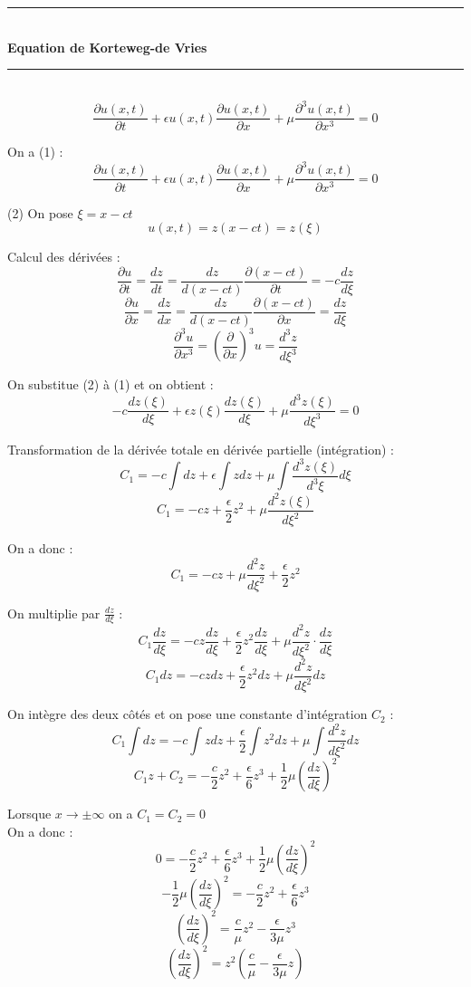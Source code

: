 \documentclass[12pt,a4paper]{article}
\begin{document}
\begin{center}
    \rule{\linewidth}{0.5pt} \\
    \Large \textbf{Equation de Korteweg-de Vries} \\
    \rule{\linewidth}{0.5pt} \\
    \vspace{0.5cm}
    \[ \frac{\partial u(x,t)}{\partial t}+\epsilon u(x,t)\frac{\partial u(x,t)}{\partial x}+\mu\frac{\partial^{3}u(x,t)}{\partial x^{3}}=0 \]
\end{center}


On a (1) :
\[ \frac{\partial u(x,t)}{\partial t}+\epsilon u(x,t)\frac{\partial u(x,t)}{\partial x}+\mu\frac{\partial^{3}u(x,t)}{\partial x^{3}}=0 \]

(2) On pose $\xi=x-ct$
\[ u(x,t)=z(x-ct)=z(\xi) \]

Calcul des dérivées :
\[ \frac{\partial u}{\partial t}=\frac{dz}{dt}=\frac{dz}{d(x-ct)}\frac{\partial(x-ct)}{\partial t}=-c\frac{dz}{d\xi} \]
\[ \frac{\partial u}{\partial x}=\frac{dz}{dx}=\frac{dz}{d(x-ct)}\frac{\partial(x-ct)}{\partial x}=\frac{dz}{d\xi} \]
\[ \frac{\partial^{3}u}{\partial x^{3}}=\left(\frac{\partial}{\partial x}\right)^{3}u=\frac{d^{3}z}{d\xi^{3}} \]

On substitue (2) à (1) et on obtient :
\[ -c\frac{dz(\xi)}{d\xi}+\epsilon z(\xi)\frac{dz(\xi)}{d\xi}+\mu\frac{d^{3}z(\xi)}{d\xi^{3}}=0 \]

Transformation de la dérivée totale en dérivée partielle (intégration) :
\[ C_{1}=-c\int dz+\epsilon\int z dz+\mu\int\frac{d^{3}z(\xi)}{d^{3}\xi} d\xi \]
\[ C_{1}=-cz+\frac{\epsilon}{2}z^{2}+\mu\frac{d^{2}z(\xi)}{d\xi^{2}} \]


On a donc :
\[ C_{1}=-cz+\mu\frac{d^{2}z}{d\xi^{2}}+\frac{\epsilon}{2}z^{2} \]

On multiplie par $\frac{dz}{d\xi}$ :
\[ C_{1}\frac{dz}{d\xi}=-cz\frac{dz}{d\xi}+\frac{\epsilon}{2}z^{2}\frac{dz}{d\xi}+\mu\frac{d^{2}z}{d\xi^{2}}\cdot\frac{dz}{d\xi} \]
\[ C_{1}dz=-cz dz+\frac{\epsilon}{2}z^{2}dz+\mu\frac{d^{2}z}{d\xi^{2}}dz \]

On intègre des deux côtés et on pose une constante d'intégration $C_2$ :
\[ C_{1}\int dz=-c\int z dz+\frac{\epsilon}{2}\int z^{2}dz+\mu\int\frac{d^{2}z}{d\xi^{2}}dz \]
\[ C_{1}z+C_{2}=-\frac{c}{2}z^{2}+\frac{\epsilon}{6}z^{3}+\frac{1}{2}\mu\left(\frac{dz}{d\xi}\right)^{2} \]

Lorsque $x \to \pm \infty$ on a $C_{1}=C_{2}=0$  \\
On a donc :
\[ 0=-\frac{c}{2}z^{2}+\frac{\epsilon}{6}z^{3}+\frac{1}{2}\mu\left(\frac{dz}{d\xi}\right)^{2} \]
\[ -\frac{1}{2}\mu\left(\frac{dz}{d\xi}\right)^{2}=-\frac{c}{2}z^{2}+\frac{\epsilon}{6}z^{3} \]
\[ \left(\frac{dz}{d\xi}\right)^{2}=\frac{c}{\mu}z^{2}-\frac{\epsilon}{3\mu}z^{3} \]
\[ \left(\frac{dz}{d\xi}\right)^{2}=z^{2}\left(\frac{c}{\mu}-\frac{\epsilon}{3\mu}z\right) \]
\end{document}
